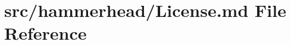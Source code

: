 \hypertarget{License_8md}{}\section{src/hammerhead/\+License.md File Reference}
\label{License_8md}
